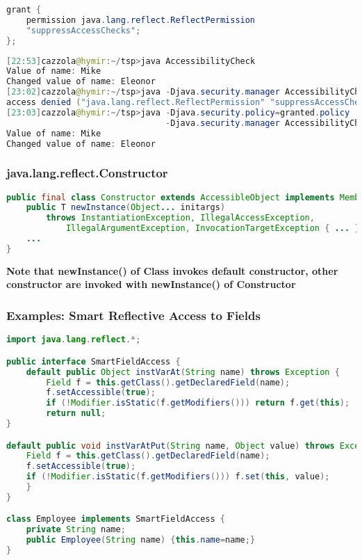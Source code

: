 \begin{lstlisting}[language=Java]
grant {
	permission java.lang.reflect.ReflectPermission
	"suppressAccessChecks";
};
\end{lstlisting}

\begin{lstlisting}[language=Java]
[22:53]cazzola@hymir:~/tsp>java AccessibilityCheck
Value of name: Mike
Changed value of name: Eleonor
[23:02]cazzola@hymir:~/tsp>java -Djava.security.manager AccessibilityCheck
access denied ("java.lang.reflect.ReflectPermission" "suppressAccessChecks")
[23:03]cazzola@hymir:~/tsp>java -Djava.security.policy=granted.policy
                                -Djava.security.manager AccessibilityCheck
Value of name: Mike
Changed value of name: Eleonor
\end{lstlisting}

\subsubsection{java.lang.reflect.Constructor}

\begin{lstlisting}[language=Java]
public final class Constructor extends AccessibleObject implements Member {
	public T newInstance(Object... initargs)
		throws InstantiationException, IllegalAccessException,
			IllegalArgumentException, InvocationTargetException { ... }
	...
}
\end{lstlisting}

\textbf{Note that newInstance() of Class invokes default constructor, other constructor are invoked with newInstance() of Constructor}

\subsubsection{Examples: Smart Reflective Access to Fields}

\begin{lstlisting}[language=Java]
import java.lang.reflect.*;

public interface SmartFieldAccess {
	default public Object instVarAt(String name) throws Exception {
		Field f = this.getClass().getDeclaredField(name);
		f.setAccessible(true);
		if (!Modifier.isStatic(f.getModifiers())) return f.get(this);
		return null;
}

default public void instVarAtPut(String name, Object value) throws Exception {
	Field f = this.getClass().getDeclaredField(name);
	f.setAccessible(true);
	if (!Modifier.isStatic(f.getModifiers())) f.set(this, value);
	}
}

class Employee implements SmartFieldAccess {
	private String name;
	public Employee(String name) {this.name=name;}
}
\end{lstlisting}

